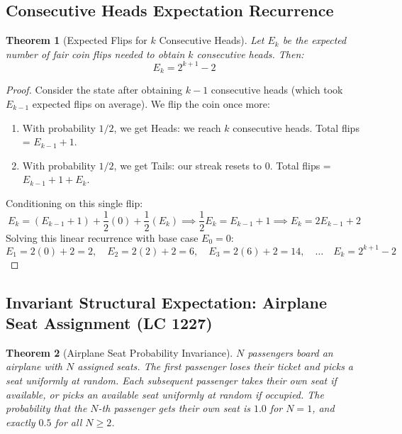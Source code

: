 \documentclass[10pt,journal,compsoc,onecolumn]{IEEEtran}
\newtheorem{theorem}{Theorem}
\begin{document}
\subsection{Consecutive Heads Expectation Recurrence}

\begin{theorem}[Expected Flips for $k$ Consecutive Heads]
Let $E_k$ be the expected number of fair coin flips needed to obtain $k$ consecutive heads. Then:
\begin{equation}
E_k = 2^{k+1} - 2
\label{eq:consecutive-heads}
\end{equation}
\end{theorem}

\begin{proof}
Consider the state after obtaining $k-1$ consecutive heads (which took $E_{k-1}$ expected flips on average). We flip the coin once more:
\begin{enumerate}
    \item With probability $1/2$, we get Heads: we reach $k$ consecutive heads. Total flips = $E_{k-1} + 1$.
    \item With probability $1/2$, we get Tails: our streak resets to 0. Total flips = $E_{k-1} + 1 + E_k$.
\end{enumerate}
Conditioning on this single flip:
\[
E_k = (E_{k-1} + 1) + \frac{1}{2}(0) + \frac{1}{2}(E_k) \implies \frac{1}{2} E_k = E_{k-1} + 1 \implies E_k = 2 E_{k-1} + 2
\]
Solving this linear recurrence with base case $E_0 = 0$:
\[
E_1 = 2(0) + 2 = 2, \quad E_2 = 2(2) + 2 = 6, \quad E_3 = 2(6) + 2 = 14, \quad \dots \quad E_k = 2^{k+1} - 2
\]
\end{proof}

\subsection{Invariant Structural Expectation: Airplane Seat Assignment (LC 1227)}

\begin{theorem}[Airplane Seat Probability Invariance]
$N$ passengers board an airplane with $N$ assigned seats. The first passenger loses their ticket and picks a seat uniformly at random. Each subsequent passenger takes their own seat if available, or picks an available seat uniformly at random if occupied. The probability that the $N$-th passenger gets their own seat is $1.0$ for $N=1$, and exactly $0.5$ for all $N \ge 2$.
\end{theorem}
\end{document}
